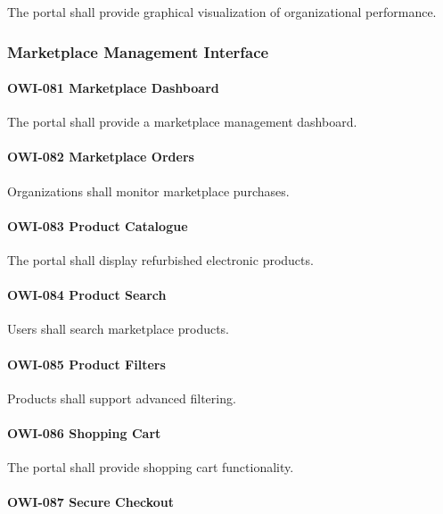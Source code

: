 The portal shall provide graphical visualization of organizational
performance.


\subsubsection*{Marketplace Management Interface}

\paragraph{OWI-081 Marketplace Dashboard}

The portal shall provide a marketplace management dashboard.

\paragraph{OWI-082 Marketplace Orders}

Organizations shall monitor marketplace purchases.

\paragraph{OWI-083 Product Catalogue}

The portal shall display refurbished electronic products.

\paragraph{OWI-084 Product Search}

Users shall search marketplace products.

\paragraph{OWI-085 Product Filters}

Products shall support advanced filtering.

\paragraph{OWI-086 Shopping Cart}

The portal shall provide shopping cart functionality.

\paragraph{OWI-087 Secure Checkout}

